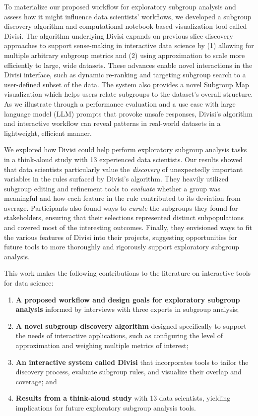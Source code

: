 To materialize our proposed workflow for exploratory subgroup analysis and assess how it might influence data scientists' workflows, we developed a subgroup discovery algorithm and computational notebook-based visualization tool called Divisi.
The algorithm underlying Divisi expands on previous slice discovery approaches to support sense-making in interactive data science by (1) allowing for multiple arbitrary subgroup metrics and (2) using approximation to scale more efficiently to large, wide datasets.
These advances enable novel interactions in the Divisi interface, such as dynamic re-ranking and targeting subgroup search to a user-defined subset of the data.
The system also provides a novel Subgroup Map visualization which helps users relate subgroups to the dataset's overall structure.
As we illustrate through a performance evaluation and a use case with large language model (LLM) prompts that provoke unsafe responses, Divisi's algorithm and interactive workflow can reveal patterns in real-world datasets in a lightweight, efficient manner.

We explored how Divisi could help perform exploratory subgroup analysis tasks in a think-aloud study with 13 experienced data scientists.
Our results showed that data scientists particularly value the \textit{discovery} of unexpectedly important variables in the rules surfaced by Divisi's algorithm.
They heavily utilized subgroup editing and refinement tools to \textit{evaluate} whether a group was meaningful and how each feature in the rule contributed to its deviation from average.
Participants also found ways to \textit{curate} the subgroups they found for stakeholders, ensuring that their selections represented distinct subpopulations and covered most of the interesting outcomes.
Finally, they envisioned ways to fit the various features of Divisi into their projects, suggesting opportunities for future tools to more thoroughly and rigorously support exploratory subgroup analysis.

This work makes the following contributions to the literature on interactive tools for data science:
\begin{enumerate}
    \item \textbf{A proposed workflow and design goals for exploratory subgroup analysis} informed by interviews with three experts in subgroup analysis;
    \item \textbf{A novel subgroup discovery algorithm} designed specifically to support the needs of interactive applications, such as configuring the level of approximation and weighing multiple metrics of interest;
    \item \textbf{An interactive system called Divisi} that incorporates tools to tailor the discovery process, evaluate subgroup rules, and visualize their overlap and coverage; and
    \item \textbf{Results from a think-aloud study} with 13 data scientists, yielding implications for future exploratory subgroup analysis tools.
\end{enumerate}